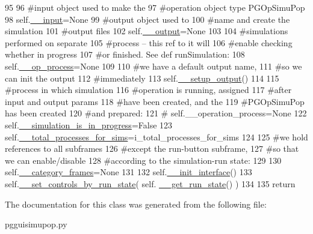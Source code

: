 \begin{DoxyCode}
95 
96         \textcolor{comment}{#input object used to make the}
97         \textcolor{comment}{#operation object type PGOpSimuPop}
98         self.\hyperlink{classnegui_1_1pgguisimupop_1_1PGGuiSimuPop_a0b9f7d933b428393d34105828600a007}{\_\_input}=\textcolor{keywordtype}{None}
99         \textcolor{comment}{#output object used to}
100         \textcolor{comment}{#name and create the simulation}
101         \textcolor{comment}{#output files}
102         self.\hyperlink{classnegui_1_1pgguisimupop_1_1PGGuiSimuPop_a30f6eabf78230001520f90cb36de339f}{\_\_output}=\textcolor{keywordtype}{None}
103 
104         \textcolor{comment}{#simulations performed on separate}
105         \textcolor{comment}{#process -- this ref to it will}
106         \textcolor{comment}{#enable checking whether in progress}
107         \textcolor{comment}{#or finished.  See def runSimulation:}
108         self.\hyperlink{classnegui_1_1pgguisimupop_1_1PGGuiSimuPop_acdcfde3516741c64806c6881f65c6f4e}{\_\_op\_process}=\textcolor{keywordtype}{None}
109 
110         \textcolor{comment}{#we have a default output name,}
111         \textcolor{comment}{#so we can init the output}
112         \textcolor{comment}{#immediately}
113         self.\hyperlink{classnegui_1_1pgguisimupop_1_1PGGuiSimuPop_a23913431472d154054d66ab5e72daf0e}{\_\_setup\_output}()
114 
115         \textcolor{comment}{#process in which simulation }
116         \textcolor{comment}{#operation is running, assigned}
117         \textcolor{comment}{#after input and output params}
118         \textcolor{comment}{#have been created, and the }
119         \textcolor{comment}{#PGOpSimuPop has been created}
120         \textcolor{comment}{#and prepared:}
121 \textcolor{comment}{#       self.\_\_operation\_process=None}
122         self.\hyperlink{classnegui_1_1pgguisimupop_1_1PGGuiSimuPop_a5064bac64c69bd13fe1366b21f1f7ad9}{\_\_simulation\_is\_in\_progress}=\textcolor{keyword}{False}
123         self.\hyperlink{classnegui_1_1pgguisimupop_1_1PGGuiSimuPop_a3885325060336297119229764f6548fb}{\_\_total\_processes\_for\_sims}=i\_total\_processes\_for\_sims
124 
125         \textcolor{comment}{#we hold references to all subframes}
126         \textcolor{comment}{#except the run-button subframe,}
127         \textcolor{comment}{#so that we can enable/disable}
128         \textcolor{comment}{#according to the simulation-run state:}
129 
130         self.\hyperlink{classnegui_1_1pgguisimupop_1_1PGGuiSimuPop_a67da63f36462b56bd1f47206d8f91c7b}{\_\_category\_frames}=\textcolor{keywordtype}{None}
131 
132         self.\hyperlink{classnegui_1_1pgguisimupop_1_1PGGuiSimuPop_ad879eb5497d756bea6d31ae282ab48f8}{\_\_init\_interface}()
133         self.\hyperlink{classnegui_1_1pgguisimupop_1_1PGGuiSimuPop_a2c5268e62f40c2548d1475959aa60ca9}{\_\_set\_controls\_by\_run\_state}( self.
      \hyperlink{classnegui_1_1pgguisimupop_1_1PGGuiSimuPop_aef182e14bccdbabf372a6344bc6f8786}{\_\_get\_run\_state}() )
134     
135         \textcolor{keywordflow}{return}
\end{DoxyCode}


The documentation for this class was generated from the following file\+:\begin{DoxyCompactItemize}
\item 
pgguisimupop.\+py\end{DoxyCompactItemize}
